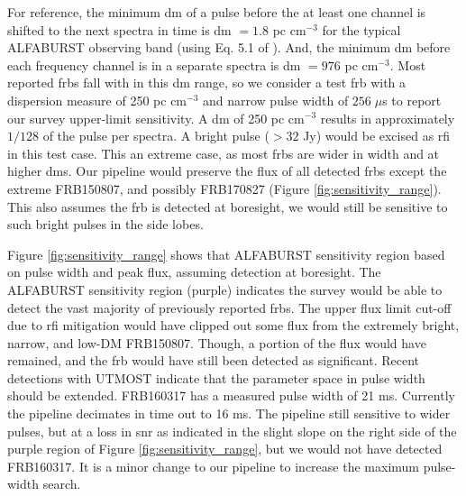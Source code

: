 \documentclass[a4paper,fleqn,usenatbib]{mnras}
\begin{document}
For reference, the minimum \gls{dm} of a pulse before the at least one channel
is shifted to the next spectra in time is \gls{dm} $=1.8$ pc cm$^{-3}$ for the
typical ALFABURST observing band (using Eq. 5.1 of \cite{2004hpa..book.....L}).
And, the minimum \gls{dm} before each frequency channel is in a separate spectra
is \gls{dm} $=976$ pc cm$^{-3}$. Most reported \glspl{frb} fall with in this
\gls{dm} range, so we consider a test \gls{frb} with a dispersion measure of 250
pc cm$^{-3}$ and narrow pulse width of $256 \; \mu$s to report our survey
upper-limit sensitivity. A \gls{dm} of 250 pc cm$^{-3}$ results in approximately
$1/128$ of the pulse per spectra. A bright pulse ($>32$ Jy) would be excised as
\gls{rfi} in this test case. This an extreme case, as most \glspl{frb} are wider
in width and at higher \glspl{dm}.  Our pipeline would preserve the flux of all
detected \glspl{frb} except the extreme FRB150807, and possibly FRB170827
(Figure \ref{fig:sensitivity_range}).  This also assumes the \gls{frb} is
detected at boresight, we would still be sensitive to such bright pulses in the
side lobes.

Figure \ref{fig:sensitivity_range} shows that ALFABURST sensitivity region based
on pulse width and peak flux, assuming detection at boresight. The ALFABURST
sensitivity region (purple) indicates the survey would be able to detect the
vast majority of previously reported \glspl{frb}. The upper flux limit cut-off
due to \gls{rfi} mitigation would have clipped out some flux from the extremely
bright, narrow, and low-DM FRB150807. Though, a portion of the flux would have
remained, and the \gls{frb} would have still been detected as significant.
Recent detections with UTMOST \citep{2017MNRAS.468.3746C,atel10697} indicate
that the parameter space in pulse width should be extended.  FRB160317 has a
measured pulse width of 21 ms. Currently the pipeline decimates in time out to
16 ms. The pipeline still sensitive to wider pulses, but at a loss in \gls{snr}
as indicated in the slight slope on the right side of the purple region of
Figure \ref{fig:sensitivity_range}, but we would not have detected FRB160317. It
is a minor change to our pipeline to increase the maximum pulse-width search.
\end{document}
